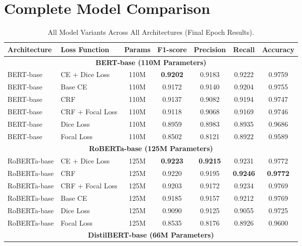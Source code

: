 \appendix

\section{Complete Model Comparison}

\begin{table}[htbp]
    \centering
    \caption{All Model Variants Across All Architectures (Final Epoch Results).}
    \begin{tabular}{l l c c c c c}
        \hline
        \textbf{Architecture} & \textbf{Loss Function} & \textbf{Params} & \textbf{F1-score} & \textbf{Precision} & \textbf{Recall} & \textbf{Accuracy} \\
        \hline
        \multicolumn{7}{c}{\textbf{BERT-base (110M Parameters)}} \\
        \hline
        BERT-base & CE + Dice Loss & 110M & \textbf{0.9202} & 0.9183 & 0.9222 & 0.9759 \\
        BERT-base & Base CE & 110M & 0.9172 & 0.9140 & 0.9204 & 0.9755 \\
        BERT-base & CRF & 110M & 0.9137 & 0.9082 & 0.9194 & 0.9747 \\
        BERT-base & CRF + Focal Loss & 110M & 0.9118 & 0.9068 & 0.9169 & 0.9746 \\
        BERT-base & Dice Loss & 110M & 0.8959 & 0.8983 & 0.8935 & 0.9686 \\
        BERT-base & Focal Loss & 110M & 0.8502 & 0.8121 & 0.8922 & 0.9589 \\
        \hline
        \multicolumn{7}{c}{\textbf{RoBERTa-base (125M Parameters)}} \\
        \hline
        RoBERTa-base & CE + Dice Loss & 125M & \textbf{0.9223} & \textbf{0.9215} & 0.9231 & 0.9772 \\
        RoBERTa-base & CRF & 125M & 0.9220 & 0.9195 & \textbf{0.9246} & \textbf{0.9772} \\
        RoBERTa-base & CRF + Focal Loss & 125M & 0.9203 & 0.9172 & 0.9234 & 0.9769 \\
        RoBERTa-base & Base CE & 125M & 0.9185 & 0.9157 & 0.9212 & 0.9769 \\
        RoBERTa-base & Dice Loss & 125M & 0.9090 & 0.9125 & 0.9055 & 0.9725 \\
        RoBERTa-base & Focal Loss & 125M & 0.8535 & 0.8176 & 0.8926 & 0.9600 \\
        \hline
        \multicolumn{7}{c}{\textbf{DistilBERT-base (66M Parameters)}} \\

\end{tabular}
\end{table}
